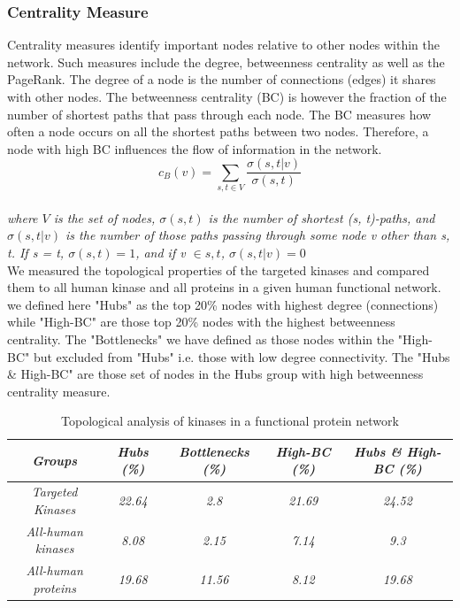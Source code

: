 \documentclass[a4paper, 11pt]{article}
\begin{document}
\subsubsection*{Centrality Measure}
Centrality measures identify important nodes relative to other nodes within the network. Such measures include the degree, betweenness centrality as well as the PageRank. The degree of a node is the number of connections (edges) it shares with other nodes. The betweenness centrality (BC) is however the fraction of the number of shortest paths that pass through each node. The BC measures how often a node occurs on all the shortest paths between two nodes. Therefore, a node with high BC influences the flow of information in the network. \[c_B(v) =\sum_{s,t \in V} \frac{\sigma(s, t|v)}{\sigma(s, t)}\]\\
\textit{where $V$ is the set of nodes, $\sigma(s, t)$ is the number of shortest (s, t)-paths, and $\sigma(s, t|v)$ is the number of those paths passing through some node v other than s, t. If s = t, $\sigma(s, t) = 1$, and if v $\in {s, t}$, $\sigma(s, t|v) = 0$}\\
We measured the topological properties of the targeted kinases and compared them to all human kinase and all proteins in a given human functional network. we defined here "Hubs" as the top 20\% nodes with highest degree (connections) while "High-BC" are those top 20\% nodes with the highest betweenness centrality. The "Bottlenecks" we have defined as those nodes within the "High-BC" but excluded from "Hubs" i.e. those with low degree connectivity. The "Hubs \& High-BC" are those set of nodes in the Hubs group with high betweenness centrality measure. 
\begin{table}[H]
\centering
\caption{Topological analysis of kinases in a functional protein network}
\label{hubs-bottlenecks}
\begin{tabular}{|c|c|c|c|c|}
\hline
\textit{Groups}             & \textit{Hubs (\%)} & \textit{Bottlenecks (\%)} & \textit{High-BC (\%)} & \textit{Hubs \& High-BC (\%)} \\ \hline
\textit{Targeted Kinases}   & \textit{22.64}     & \textit{2.8}              & \textit{21.69}        & \textit{24.52}                \\ \hline
\textit{All-human kinases}  & \textit{8.08}      & \textit{2.15}             & \textit{7.14}         & \textit{9.3}                  \\ \hline
\textit{All-human proteins} & \textit{19.68}     & \textit{11.56}            & \textit{8.12}         & \textit{19.68}                \\ \hline
\end{tabular}
\end{table}
\end{document}
